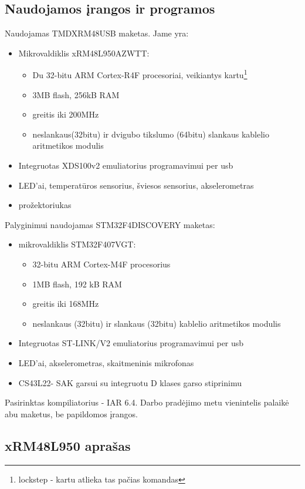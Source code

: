 \documentclass[a4paper, 12pt]{article} %
\begin{document}
\begin{onehalfspacing}
\newpage

\section{Naudojamos \k{i}rangos ir programos}
Naudojamas TMDXRM48USB maketas. Jame yra:
\begin{itemize}
\item Mikrovaldiklis xRM48L950AZWTT:
\begin{itemize}
\item Du 32-bitu ARM Cortex-R4F procesoriai, veikiantys kartu\footnote{lockstep - kartu atlieka tas pa\v{c}ias komandas}
\item 3MB flash, 256kB RAM
\item greitis iki 200MHz
\item neslankaus(32bitu) ir dvigubo tikslumo (64bitu) slankaus kablelio aritmetikos modulis
\end{itemize} 
\item Integruotas XDS100v2 emuliatorius programavimui per usb
\item LED'ai, temperat\=uros sensorius, \v{s}viesos sensorius, akselerometras
\item pro\v{z}ektoriukas
\end{itemize}
Palyginimui naudojamas STM32F4DISCOVERY maketas:
\begin{itemize}
\item mikrovaldiklis STM32F407VGT:
\begin{itemize}
\item 32-bitu ARM Cortex-M4F procesorius
\item 1MB flash, 192 kB RAM 
\item greitis iki 168MHz 
\item neslankaus (32bitu) ir slankaus (32bitu) kablelio aritmetikos modulis
\end{itemize}
\item Integruotas ST-LINK/V2 emuliatorius programavimui per usb
\item LED'ai, akselerometras, skaitmeninis mikrofonas
\item CS43L22- SAK garsui su integruotu D klases garso stiprinimu
\end{itemize}
Pasirinktas kompiliatorius - IAR 6.4. Darbo prad\.ejimo metu vienintelis palaik\.e abu maketus, be papildomos \k{i}rangos. 
\subsection{xRM48L950 apra\v{s}as}
 

\end{onehalfspacing}
\end{document}
